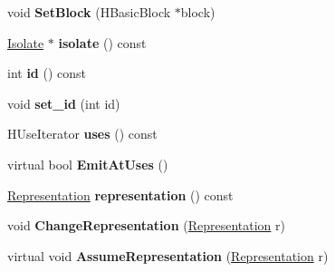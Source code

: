 \begin{DoxyCompactItemize}
\item 
\hypertarget{classv8_1_1internal_1_1_h_value_ad3063be7771a17420a827fcd56acd67e}{}void {\bfseries Set\+Block} (H\+Basic\+Block $\ast$block)\label{classv8_1_1internal_1_1_h_value_ad3063be7771a17420a827fcd56acd67e}

\item 
\hypertarget{classv8_1_1internal_1_1_h_value_a6414479c82d49fd1edb2b17d2fa42a0f}{}\hyperlink{classv8_1_1internal_1_1_isolate}{Isolate} $\ast$ {\bfseries isolate} () const \label{classv8_1_1internal_1_1_h_value_a6414479c82d49fd1edb2b17d2fa42a0f}

\item 
\hypertarget{classv8_1_1internal_1_1_h_value_a0111a91ef51b27d2aa7c498336fab254}{}int {\bfseries id} () const \label{classv8_1_1internal_1_1_h_value_a0111a91ef51b27d2aa7c498336fab254}

\item 
\hypertarget{classv8_1_1internal_1_1_h_value_ab5438bb2e24a64190d9befd4f7710bd6}{}void {\bfseries set\+\_\+id} (int id)\label{classv8_1_1internal_1_1_h_value_ab5438bb2e24a64190d9befd4f7710bd6}

\item 
\hypertarget{classv8_1_1internal_1_1_h_value_a86039f965901302ac35af6405319521a}{}H\+Use\+Iterator {\bfseries uses} () const \label{classv8_1_1internal_1_1_h_value_a86039f965901302ac35af6405319521a}

\item 
\hypertarget{classv8_1_1internal_1_1_h_value_a3aa6ef688379d6642267f19951b7fd11}{}virtual bool {\bfseries Emit\+At\+Uses} ()\label{classv8_1_1internal_1_1_h_value_a3aa6ef688379d6642267f19951b7fd11}

\item 
\hypertarget{classv8_1_1internal_1_1_h_value_a99cd37410471bb8fead728700e1cf02e}{}\hyperlink{classv8_1_1internal_1_1_representation}{Representation} {\bfseries representation} () const \label{classv8_1_1internal_1_1_h_value_a99cd37410471bb8fead728700e1cf02e}

\item 
\hypertarget{classv8_1_1internal_1_1_h_value_a61c73dfe70c6ca204e168b7d58152ae8}{}void {\bfseries Change\+Representation} (\hyperlink{classv8_1_1internal_1_1_representation}{Representation} r)\label{classv8_1_1internal_1_1_h_value_a61c73dfe70c6ca204e168b7d58152ae8}

\item 
\hypertarget{classv8_1_1internal_1_1_h_value_a6eedc25cb28d18fbab17b5bc5386293b}{}virtual void {\bfseries Assume\+Representation} (\hyperlink{classv8_1_1internal_1_1_representation}{Representation} r)\label{classv8_1_1internal_1_1_h_value_a6eedc25cb28d18fbab17b5bc5386293b}


\end{DoxyCompactItemize}
